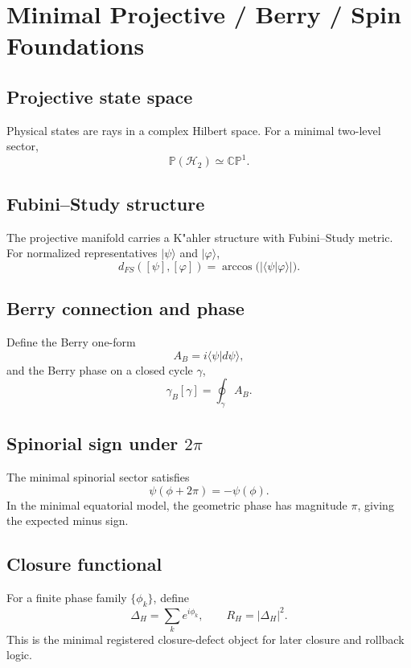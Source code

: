 \section{Minimal Projective / Berry / Spin Foundations}
\label{sec:minimal-projective-berry-spin}

\subsection{Projective state space}
Physical states are rays in a complex Hilbert space. For a minimal two-level sector,
\begin{equation}
\mathbb{P}(\mathcal H_2) \simeq \mathbb{CP}^1.
\end{equation}

\subsection{Fubini--Study structure}
The projective manifold carries a K"ahler structure with Fubini--Study metric. For normalized representatives $|\psi\rangle$ and $|\varphi\rangle$,
\begin{equation}
 d_{FS}([\psi],[\varphi]) = \arccos\big(|\langle \psi | \varphi \rangle|\big).
\end{equation}

\subsection{Berry connection and phase}
Define the Berry one-form
\begin{equation}
A_B = i\langle \psi | d\psi \rangle,
\end{equation}
and the Berry phase on a closed cycle $\gamma$,
\begin{equation}
\gamma_B[\gamma] = \oint_\gamma A_B.
\end{equation}

\subsection{Spinorial sign under $2\pi$}
The minimal spinorial sector satisfies
\begin{equation}
\psi(\phi + 2\pi) = -\psi(\phi).
\end{equation}
In the minimal equatorial model, the geometric phase has magnitude $\pi$, giving the expected minus sign.

\subsection{Closure functional}
For a finite phase family $\{\phi_k\}$, define
\begin{equation}
\Delta_H = \sum_k e^{i\phi_k},
\qquad
R_H = |\Delta_H|^2.
\end{equation}
This is the minimal registered closure-defect object for later closure and rollback logic.
